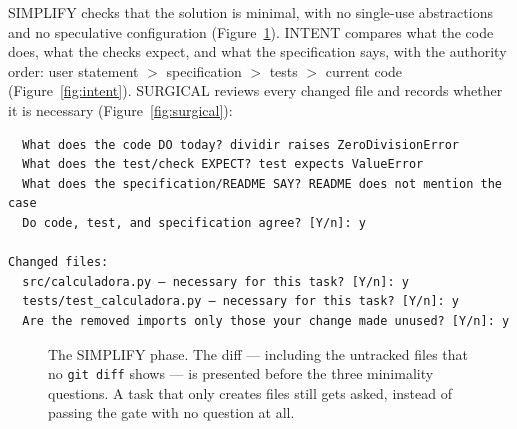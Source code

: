 \documentclass{sbc2019}%
\begin{document}
SIMPLIFY checks that the solution is minimal, with no single-use
abstractions and no speculative configuration (Figure~\ref{fig:simplify}).
INTENT compares what the code does, what the checks expect, and what the
specification says, with the authority order: user statement $>$
specification $>$ tests $>$ current code (Figure~\ref{fig:intent}).
SURGICAL reviews every changed file and records whether it is necessary
(Figure~\ref{fig:surgical}):

\begin{lstlisting}
  What does the code DO today? dividir raises ZeroDivisionError
  What does the test/check EXPECT? test expects ValueError
  What does the specification/README SAY? README does not mention the case
  Do code, test, and specification agree? [Y/n]: y

Changed files:
  src/calculadora.py — necessary for this task? [Y/n]: y
  tests/test_calculadora.py — necessary for this task? [Y/n]: y
  Are the removed imports only those your change made unused? [Y/n]: y
\end{lstlisting}


\begin{figure}[!ht]
\centering
{}
\caption{The SIMPLIFY phase. The diff --- including the untracked files
that no \texttt{git diff} shows --- is presented before the three
minimality questions. A task that only creates files still gets asked,
instead of passing the gate with no question at all.}
\label{fig:simplify}
\end{figure}
\end{document}
